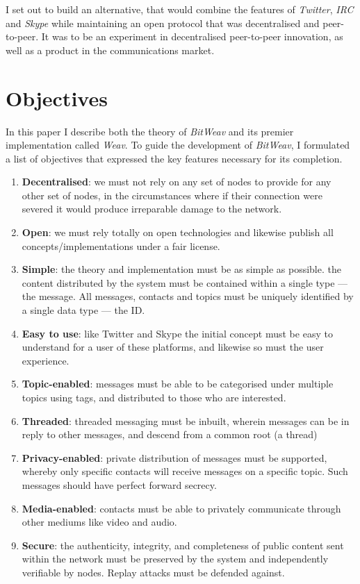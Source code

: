 \documentclass[10pt,a4paper,onecolumn]{article}
\begin{document}
I set out to build an alternative, that would combine the features of \textit{Twitter}, \textit{IRC} and \textit{Skype} while maintaining an open protocol that was decentralised and peer-to-peer. It was to be an experiment in decentralised peer-to-peer innovation, as well as a product in the communications market.

\section{Objectives}
In this paper I describe both the theory of \textit{BitWeav} and its premier implementation called \textit{Weav}. To guide the development of \textit{BitWeav}, I formulated a list of objectives that expressed the key features necessary for its completion.
\begin{enumerate}
\item \textbf{Decentralised}: we must not rely on any set of nodes to provide for any other set of nodes, in the circumstances where if their connection were severed it would produce irreparable damage to the network. 

\item \textbf{Open}: we must rely totally on open technologies and likewise publish all concepts/implementations under a fair license.

\item \textbf{Simple}: the theory and implementation must be as simple as possible. the content distributed by the system must be contained within a single type — the message. All messages, contacts and topics must be uniquely identified by a single data type — the ID.

\item \textbf{Easy to use}: like Twitter and Skype the initial concept must be easy to understand for a user of these platforms, and likewise so must the user experience.

\item \textbf{Topic-enabled}: messages must be able to be categorised under multiple topics using tags, and distributed to those who are interested.

\item \textbf{Threaded}: threaded messaging must be inbuilt, wherein messages can be in reply to other messages, and descend from a common root (a thread)

\item \textbf{Privacy-enabled}: private distribution of messages must be supported, whereby only specific contacts will receive messages on a specific topic. Such messages should have perfect forward secrecy. 

\item \textbf{Media-enabled}: contacts must be able to privately communicate through other mediums like video and audio. 

\item \textbf{Secure}: the authenticity, integrity, and completeness of public content sent within the network must be preserved by the system and independently verifiable by nodes. Replay attacks must be defended against.
\end{enumerate}
\end{document}
